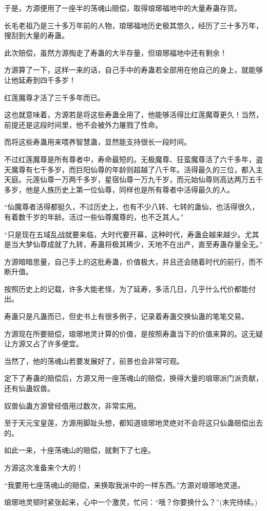 \begin{this_body}
于是，方源便用了一座半的荡魂山赔偿，取得琅琊福地中的大量寿蛊存货。

长毛老祖乃是三十多万年前的人物，琅琊福地历史极其悠久，经历了三十多万年，搜刮到大量的寿蛊。

此次赔偿，虽然方源掏走了寿蛊的大半存量，但琅琊福地中还有剩余！

方源算了一下，这样一来的话，自己手中的寿蛊若全部用在他自己的身上，就能够让他延寿到四千多岁！

红莲魔尊才活了三千多年而已。

这也就意味着，方源若是将这些寿蛊全用了，他能够活得比红莲魔尊更久！当然，前提还是这段时间里，他不会被外力屠戮了性命。

而将这些寿蛊用来喂养智慧蛊，显然能支持很长一段时间。

不过红莲魔尊是所有尊者中，寿命最短的。无极魔尊、狂蛮魔尊活了六千多年，盗天魔尊有七千多岁，而巨阳仙尊的年龄则超越了八千年。活得最久的三位，都入主天庭。元莲仙尊一万两千多岁，星宿仙尊一万九千岁，而元始仙尊则高达两万五千多岁，他是人族历史上第一位仙尊，同样也是所有尊者中活得最久的人。

“仙魔尊者活得都挺久，不过历史上，也有不少八转、七转的蛊仙，也活得很久，有着数千岁的年龄。活过一些仙尊魔尊的，也不乏其人。”

“只是现在五域乱战就要来临，大时代要开幕，这种时代，寿蛊会越来越少。尤其是当大梦仙尊成就了九转，寿蛊将极其稀少，天地不在出产，直至寿蛊存量全无。”

方源暗暗思量，自己手上的这批寿蛊，价值极大，并且还会随着时代的前行，而不断升值。

按照历史上的记载，许多大能老怪，为了延寿，多活几日，几乎什么代价都能付出。

寿蛊只是凡蛊而已，但史书上有很多例子，记录着寿蛊交换仙蛊的笔笔交易。

方源现在所要赔偿，琅琊地灵计算的价值，是按照寿蛊当下的价值来算的。这无疑让方源又占了许多便宜。

当然了，他的荡魂山若要发展好了，前景也会非常可观。

定下了寿蛊的赔偿后，方源又用一座荡魂山的赔偿，换得大量的琅琊派门派贡献，还有仙蛊奴兽。

奴兽仙蛊方源曾经借用过数次，非常实用。

至于天元宝皇莲，方源用脚趾头想，都知道琅琊地灵绝对不会将这只仙蛊赔偿出去的。

如此一来，十座荡魂山的赔偿，就剩下了七座。

方源这次准备来个大的！

“我要用七座荡魂山的赔偿，来换取我派中的一样东西。”方源对琅琊地灵道。

琅琊地灵顿时紧张起来，心中一个激灵，忙问：“哦？你要换什么？”(未完待续。)

\end{this_body}

